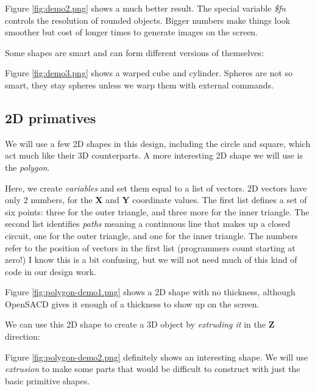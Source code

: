
Figure \ref{fig:demo2.png} shows a much better result. The special variable
{\it \$fn} controls the resolution of rounded objects. Bigger numbers make
things look smoother but cost of longer times to generate images on the screen.



Some shapes are smart and can form different versions of themselves:


Figure \ref{fig:demo3.png} shows a warped cube and cylinder. Spheres are not so
smart, they stay spheres unless we warp them with external commands.



\subsection*{2D primatives}

We will use a few 2D shapes in this design, including the circle and square,
which act much like their 3D counterparts. A more interesting 2D shape we will
use is the {\it polygon}.


Here, we create {\it variables} and set them equal to a list of vectors. 2D
vectors have only 2 numbers, for the {\bf X} and {\bf Y} coordinate values. The
first list defines a set of six points: three for the outer triangle, and three
more for the inner triangle. The second list identifies {\it paths} meaning a
continuous line that makes up a closed circuit, one for the outer triangle, and
one for the inner triangle. The numbers refer to the position of vectors in the
first list (programmers count starting at zero!) I know this is a bit
confusing, but we will not need much of this kind of code in our design work.


Figure \ref{fig:polygon-demo1.png} shows a  2D shape with no thickness, although
OpenSACD gives it enough of a thickness to show up on the screen.

We can use this 2D shape to create a 3D object by {\it extruding it} in the
{\bf Z} direction:


Figure \ref{fig:polygon-demo2.png} definitely shows an interesting shape. We
will use {\it extrusion} to make some parts that would be difficult to construct
with just the basic primitive shapes.

